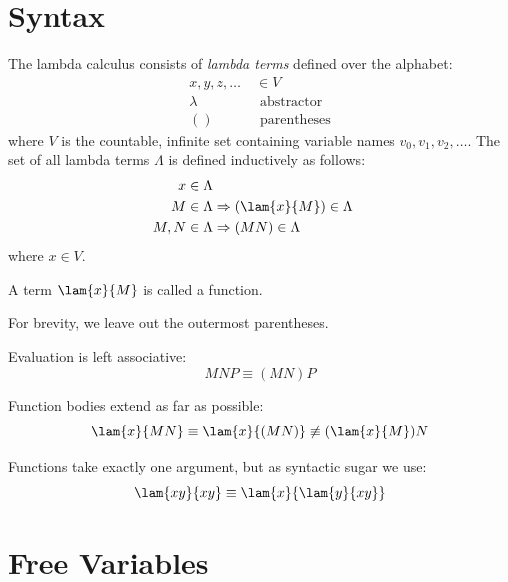 \section{Syntax}
\begin{definition}
	The lambda calculus consists of \emph{lambda terms} defined over the alphabet:
	\begin{align*}
		x,y,z,\hdots\ &\in V\\
		\lambda\ &\text{ abstractor} \\
		()\ &\text{ parentheses}
	\end{align*}
	where $V$ is the countable, infinite set containing variable names $v_0,v_1,v_2,\hdots$.
	The set of all lambda terms $\Lambda$ is defined inductively as follows:
	\label{def:grammar}
	\begin{align*}
		x\in\Lambda \\
		M\in\Lambda &\Rightarrow (\lam{x}{M})\in\Lambda \\
		M, N\in\Lambda &\Rightarrow (M N)\in\Lambda
	\end{align*}
where $x\in V$.
\end{definition}
\begin{convention}
	\label{con:con1}
	A term $\lam{x}{M}$ is called a function.
\end{convention}
\begin{convention}
	For brevity, we leave out the outermost parentheses.
\end{convention}
\begin{convention}
	Evaluation is left associative:
	\begin{equation*}
		M N P \equiv (M N) P
	\end{equation*}
\end{convention}
\begin{convention}
	Function bodies extend as far as possible:
	\begin{equation*}
		\lam{x}{M N}\equiv\lam{x}{(M N)}\not\equiv(\lam{x}{M})N
	\end{equation*}
\end{convention}
\begin{convention}
	\label{con:con2}
	Functions take exactly one argument, but as syntactic sugar we use:
	\begin{equation*}
		\lam{xy}{xy}\equiv\lam{x}{\lam{y}{xy}}
	\end{equation*}
\end{convention}

\section{Free Variables}

